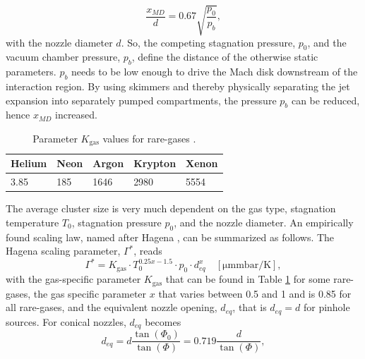 \begin{equation}
\frac{x_{MD}}{d}=0.67\sqrt{\frac{p_{0}}{p_{b}}},
\label{eq:distance-of-mach-disk}
\end{equation}
with the nozzle diameter $d$. So, the competing stagnation pressure, $p_{0}$, and the vacuum chamber pressure, $p_{b}$, define the distance of the otherwise static parameters. $p_{b}$ needs to be low enough to drive the Mach disk downstream of the interaction region. By using skimmers and thereby physically separating the jet expansion into separately pumped compartments, the pressure $p_{b}$ can be reduced, hence $x_{MD}$ increased.\\[1\baselineskip]
%
\begin{table}
	\centering
		\begin{tabular}{ | l | l | l | l | l | }
			\hline
			Helium & Neon & Argon & Krypton & Xenon \\ \hline
			3.85 & 185 & 1646 & 2980 & 5554 \\ \hline
		\end{tabular}
	\caption[Parameter $K_{\text{gas}}$ values for rare-gases.]{Parameter $K_{\text{gas}}$ values for rare-gases \citep{Schorb-2012-Thesis}.}
	\label{tab:k-parameter}
\end{table}
The average cluster size is very much dependent on the gas type, stagnation temperature $T_{0}$, stagnation pressure $p_{0}$, and the nozzle diameter. An empirically found scaling law, named after Hagena \citep{Hagena-1972-JCP,Hagena-1981-SurfSci,Hagena-1987-ZeitschriftAMC}, can be summarized as follows. The Hagena scaling parameter, $\Gamma^{*}$, reads
\begin{equation}
\Gamma^{*} = K_{\text{gas}} \cdot T_{0}^{0.25x-1.5} \cdot p_{0} \cdot d_{eq}^{x}\quad \left[\si{\micro\meter\milli\bar\per\kelvin}\right],
\label{eq:Hagena-parameter}
\end{equation}
with the gas-specific parameter $K_{\text{gas}}$ that can be found in Table \ref{tab:k-parameter} for some rare-gases, the gas specific parameter $x$ that varies between 0.5 and 1 and is 0.85 for all rare-gases, and the equivalent nozzle opening, $d_{eq}$, that is $d_{eq}=d$ for pinhole sources. For conical nozzles, $d_{eq}$ becomes \citep{Schorb-2012-Thesis}
\begin{equation}
d_{eq} = d\frac{\tan\left(\Phi_{0}\right)}{\tan\left(\Phi\right)} = 0.719 \frac{d}{\tan\left(\Phi\right)},
\label{eq:equivalent-nozzle-opening}
\end{equation}
